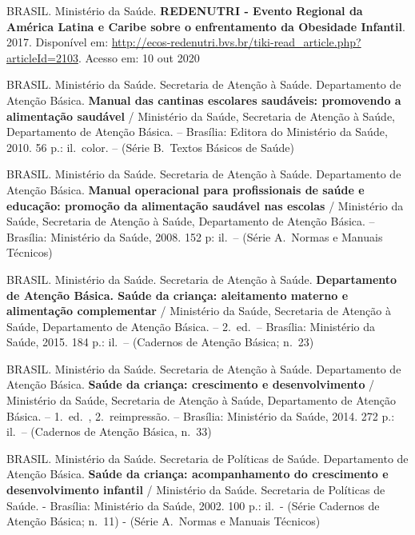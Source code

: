 \noindent BRASIL. Ministério da Saúde. \textbf{REDENUTRI - Evento Regional da América Latina e Caribe sobre o enfrentamento da Obesidade Infantil}. 2017. Disponível em: \url{http://ecos-redenutri.bvs.br/tiki-read\_article.php?articleId=2103}. Acesso em: 10 out 2020

\bigbreak

\noindent BRASIL. Ministério da Saúde. Secretaria de Atenção à Saúde. Departamento de Atenção Básica. \textbf{Manual das cantinas escolares saudáveis: promovendo a alimentação saudável} / Ministério da Saúde, Secretaria de Atenção à Saúde, Departamento de Atenção Básica. – Brasília: Editora do Ministério da Saúde, 2010. 56 p.: il.\ color. – (Série B.\ Textos Básicos de Saúde)

\bigbreak

\noindent BRASIL. Ministério da Saúde. Secretaria de Atenção à Saúde. Departamento de Atenção Básica. \textbf{Manual operacional para profissionais de saúde e educação: promoção da alimentação saudável nas escolas} / Ministério da Saúde, Secretaria de Atenção à Saúde, Departamento de Atenção Básica. – Brasília: Ministério da Saúde, 2008. 152 p: il.\ – (Série A.\ Normas e Manuais Técnicos)

\bigbreak

\noindent BRASIL. Ministério da Saúde. Secretaria de Atenção à Saúde. \textbf{Departamento de Atenção Básica. Saúde da criança: aleitamento materno e alimentação complementar} / Ministério da Saúde, Secretaria de Atenção à Saúde, Departamento de Atenção Básica. – 2.\ ed.\ – Brasília: Ministério da Saúde, 2015. 184 p.: il.\ – (Cadernos de Atenção Básica; n.\ 23)

\bigbreak

\noindent BRASIL. Ministério da Saúde. Secretaria de Atenção à Saúde. Departamento de Atenção Básica. \textbf{Saúde da criança: crescimento e desenvolvimento} / Ministério da Saúde, Secretaria de Atenção à Saúde, Departamento de Atenção Básica. – 1.\ ed.\ , 2.\ reimpressão. – Brasília: Ministério da Saúde, 2014. 272 p.: il.\ – (Cadernos de Atenção Básica, n.\ 33)

\bigbreak

\noindent BRASIL. Ministério da Saúde. Secretaria de Políticas de Saúde. Departamento de Atenção Básica. \textbf{Saúde da criança: acompanhamento do crescimento e desenvolvimento infantil} / Ministério da Saúde. Secretaria de Políticas de Saúde. - Brasília: Ministério da Saúde, 2002. 100 p.: il.\ - (Série Cadernos de Atenção Básica; n.\ 11) - (Série A.\ Normas e Manuais Técnicos)
\bigbreak

